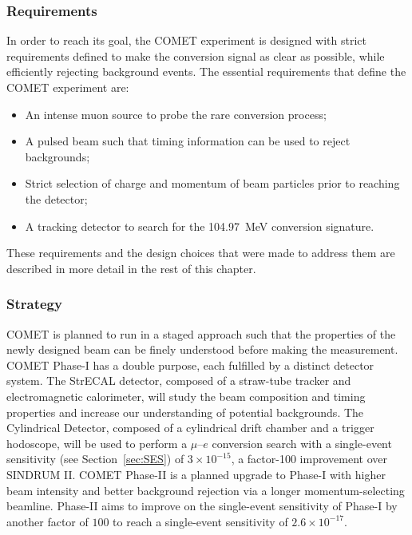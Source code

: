 \subsubsection{Requirements}
In order to reach its goal, the COMET experiment is designed with strict
requirements defined to make the conversion signal as clear as possible, while
efficiently rejecting background events. The essential requirements that define
the COMET experiment are:
\begin{itemize}
    \item An intense muon source to probe the rare conversion process;
    \item A pulsed beam such that timing information can be used to reject backgrounds;
    \item Strict selection of charge and momentum of beam particles prior to
    reaching the detector;
    \item A tracking detector to search for the \SI{104.97}{\MeV} conversion signature.
\end{itemize}
These requirements and the design choices that were made to address them are
described in more detail in the rest of this chapter.

\subsubsection{Strategy}
COMET is planned to run in a staged approach such that the properties of the
newly designed beam can be finely understood before making the measurement.
COMET Phase-I has a double purpose, each fulfilled by a distinct detector
system. The StrECAL detector, composed of a straw-tube tracker and
electromagnetic calorimeter, will study the beam composition and timing
properties and increase our understanding of potential backgrounds. The
Cylindrical Detector, composed of a cylindrical drift chamber and a trigger
hodoscope, will be used to perform a $\mu$--$e$ conversion search with a
single-event sensitivity (see Section~\ref{sec:SES}) of $3\times 10^{-15}$, a
factor-100 improvement over SINDRUM II. COMET Phase-II is a planned upgrade to
Phase-I with higher beam intensity and better background rejection via a longer
momentum-selecting beamline. Phase-II aims to improve on the single-event
sensitivity of Phase-I by another factor of $100$ to reach a single-event
sensitivity of $2.6\times 10^{-17}$.

